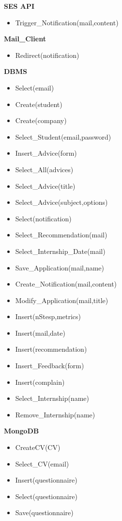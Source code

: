 		\textbf{SES API}
		\begin{itemize}
			\item Trigger\_Notification(mail,content)
		\end{itemize}
		
		\textbf{Mail\_Client}
		\begin{itemize}
			\item Redirect(notification)
		\end{itemize}
		
		\textbf{DBMS}
		\begin{itemize}
			\item Select(email)
			\item Create(student)
			\item Create(company)
			\item Select\_Student(email,password)
			\item Insert\_Advice(form)
			\item Select\_All(advices)
			\item Select\_Advice(title)
			\item Select\_Advice(subject,options)
			\item Select(notification)
			\item Select\_Recommendation(mail)
			\item Select\_Internship\_Date(mail)
			\item Save\_Application(mail,name)
			\item Create\_Notification(mail,content)
			\item Modify\_Application(mail,title)
			\item Insert(nStesp,metrics)
			\item Insert(mail,date)
			\item Insert(recommendation)
			\item Insert\_Feedback(form)
			\item Insert(complain)
			\item Select\_Internship(name)
			\item Remove\_Internship(name)
		\end{itemize}
		
		\textbf{MongoDB}
		\begin{itemize}
			\item CreateCV(CV)
			\item Select\_CV(email)
			\item Insert(questionnaire)
			\item Select(questionnaire)
			\item Save(questionnaire)
		\end{itemize}
		
